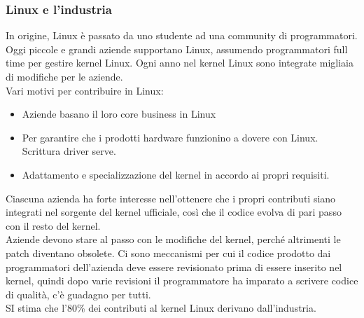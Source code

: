 \documentclass[12pt, oneside]{extbook}
\begin{document}
\subsubsection{Linux e l'industria}
In origine, Linux è passato da uno studente ad una community di programmatori. Oggi piccole e grandi aziende supportano Linux, assumendo programmatori full time per gestire kernel Linux. Ogni anno nel kernel Linux sono integrate migliaia di modifiche per le aziende.\\ Vari motivi per contribuire in Linux:
\begin{itemize}
\item Aziende basano il loro core business in Linux
\item Per garantire che i prodotti hardware funzionino a dovere con Linux. Scrittura driver serve.
\item Adattamento e specializzazione del kernel in accordo ai propri requisiti.
\end{itemize}
Ciascuna azienda ha forte interesse nell'ottenere che i propri contributi siano integrati nel sorgente del kernel ufficiale, così che il codice evolva di pari passo con il resto del kernel.\\ Aziende devono stare al passo con le modifiche del kernel, perché altrimenti le patch diventano obsolete. Ci sono meccanismi per cui il codice prodotto dai programmatori dell'azienda deve essere revisionato prima di essere inserito nel kernel, quindi dopo varie revisioni il programmatore ha imparato a scrivere codice di qualità, c'è guadagno per tutti.\\ SI stima che l'80\% dei contributi al kernel Linux derivano dall'industria.
\end{document}
